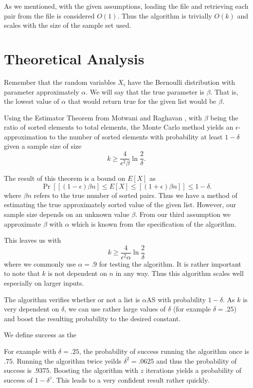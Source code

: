 \documentclass[11pt]{article}
\begin{document}
As we mentioned, with the given assumptions, loading the file and retrieving each pair from the file is considered $O(1)$. Thus the algorithm is trivially $O(k)$ and scales with the size of the sample set used. 

\section{Theoretical Analysis}

Remember that the random variables $X_i$ have the Bernoulli distribution with parameter approximately $\alpha$. We will say that the true parameter is $\beta$. That is, the lowest value of $\alpha$ that would return true for the given list would be $\beta$. 

Using the Estimator Theorem from Motwani and Raghavan \cite{textbook}, with $\beta$ being the ratio of sorted elements to total elements, the Monte Carlo method yields an $\epsilon$-approximation to the number of sorted elements with probability at least $1-\delta$ given a sample size of size $$k \geq \frac{4}{\epsilon^2 \beta} \ln \frac{2}{\delta}.$$ 

The result of this theorem is a bound on $E[X]$ as $$\Pr\left[ [(1-\epsilon)\beta n] \leq E[X] \leq [(1+\epsilon)\beta n] \right] \leq 1 - \delta.$$ where $\beta n$ refers to the true number of sorted pairs. Thus we have a method of estimating the true approximately sorted value of the given list. However, our sample size depends on an unknown value $\beta$. From our third assumption we approximate $\beta$ with $\alpha$ which is known from the specification of the algorithm. 

This leaves us with $$k \geq \frac{4}{\epsilon^2 \alpha} \ln \frac{2}{\delta}$$ where we commonly use $\alpha = .9$ for testing the algorithm. It is rather important to note that $k$ is not dependent on $n$ in any way. Thus this algorithm scales well especially on larger inputs.

The algorithm verifies whether or not a list is $\alpha$AS with probability $1 - \delta$. As $k$ is very dependent on $\delta$, we can use rather large values of $\delta$ (for example $\delta = .25$) and boost the resulting probability to the desired constant. 

We define success as the 

For example with $\delta = .25$, the probability of success running the algorithm once is $.75$. Running the algorithm twice yeilds $\delta^2 = .0625$ and thus the probability of success is $.9375$. Boosting the algorithm with $z$ iterations yields a probability of success of $1 - \delta^z$. This leads to a very confident result rather quickly. 
\end{document}
